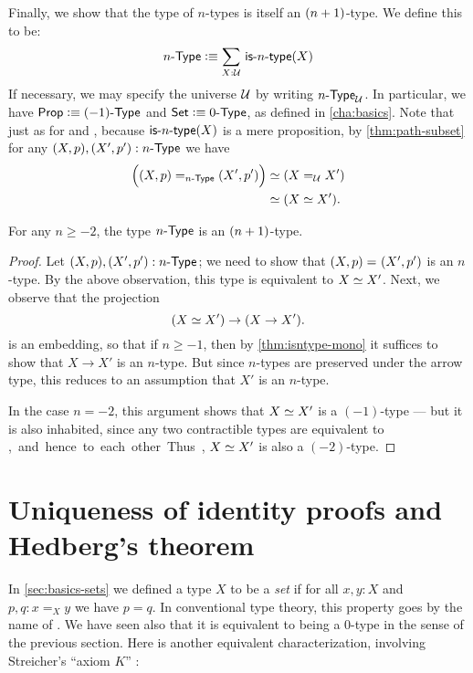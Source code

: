 Finally, we show that the type of $n$-types is itself an $\nplusone$-type.
We define this to be:
\[\ntype{n} \defeq \sm{X : \type} \istype{n}(X) \]
If necessary, we may specify the universe $\UU$ by writing $\ntypeU{n}$.
In particular, we have $\prop \defeq \ntype{(-1)}$ and $\set \defeq \ntype{0}$, as defined in \autoref{cha:basics}.
Note that just as for \prop and \set, because $\istype{n}(X)$ is a mere proposition, by \autoref{thm:path-subset} for any $(X,p), (X',p'):\ntype{n}$ we have
\begin{align*}
  \Big(\id[\ntype{n}]{(X, p)}{(X', p')}\Big) &\eqvsym (\id[\type] X X')\\
  &\eqvsym (\eqv{X}{X'}).
\end{align*}

\begin{thm}\label{thm:hleveln-of-hlevelSn}
 For any $n \geq -2$, the type $\ntype{n}$ is an $\nplusone$-type.
\end{thm}
\begin{proof}%
  Let $(X, p), (X', p') : \ntype{n}$; we need to show that $\id{(X, p)}{(X', p')}$ is an $n$-type.
  By the above observation, this type is equivalent to $\eqv{X}{X'}$.
  Next, we observe that the projection
  \[(\eqv{X}{X'}) \to (X \rightarrow X').\]
  is an embedding, so that if $n\geq -1$, then by \autoref{thm:isntype-mono} it suffices to show that $X \rightarrow X'$ is an $n$-type.
  But since $n$-types are preserved under the arrow type, this reduces to an assumption that $X'$ is an $n$-type.

  In the case $n=-2$, this argument shows that $\eqv{X}{X'}$ is a $(-1)$-type --- but it is also inhabited, since any two contractible types
are equivalent to \unit, and hence to each other.
  Thus, $\eqv{X}{X'}$ is also a $(-2)$-type.
\end{proof}

\section{Uniqueness of identity proofs and Hedberg's theorem}
\label{sec:hedberg}

In \autoref{sec:basics-sets} we defined a type $X$ to be a \emph{set} if for all $x, y : X$ and $p, q : x =_X y$ we have $p = q$.
In conventional type theory, this property goes by the name of .
%
%
We have seen also that it is equivalent to being a $0$-type in the sense of the previous section.
Here is another equivalent characterization, involving Streicher's ``axiom $K$'' \cite{StreicherK}:

